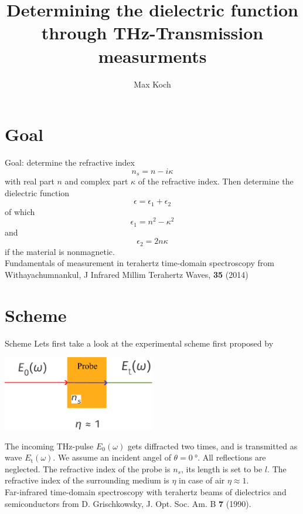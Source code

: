 \documentclass[aspectratio=1610, 9pt]{beamer}
\title{Determining the dielectric function through THz-Transmission measurments}
\author[M.~Koch]{Max Koch}
\institute[AG Wang]{Arbeitsgruppe Wang \\  Fakultät Physik}
\begin{document}
\maketitle

\section{Goal}
\begin{frame}
Goal: determine the refractive index \
\begin{equation}
  n_s = n - i\kappa
\end{equation}
with real part $n$ and complex part $\kappa$ of the refractive index.
Then determine the dielectric function 
\begin{equation}
  \epsilon = \epsilon_1 + \epsilon_2
\end{equation}
of which
\begin{equation}
  \epsilon_1 = n^2 - \kappa^2
\end{equation}
and 
\begin{equation}
  \epsilon_2  = 2n\kappa 
\end{equation}
if the material is nonmagnetic.\\
\textcolor{tugreen}{Fundamentals of measurement in terahertz time-domain spectroscopy} from Withayachumnankul, J Infrared Millim Terahertz Waves, \textbf{35} (2014) 
\end{frame}

\section{Scheme}
\begin{frame}{Scheme}
  Lets first take a look at the experimental scheme first proposed by\\
  \begin{center}
    \includegraphics[width=0.5\textwidth]{images/Transmission.pdf}
\end{center}
The incoming THz-pulse $E_0(\omega)$ gets diffracted two times, and is transmitted as wave $E_\text{t}(\omega)$.
We assume an incident angel of $\theta=\SI{0}{\degree}$.
All reflections are neglected.
The refractive index of the probe is $n_s$, its length is set to be $l$.
The refractive index of the surrounding medium is $\eta$ in case of air $\eta\approx 1$.\\
\textcolor{tugreen}{Far-infrared time-domain spectroscopy with terahertz beams of dielectrics and semiconductors} from D. Grischkowsky, J. Opt. Soc. Am. B \textbf{7} (1990).
\end{frame}
\end{document}
